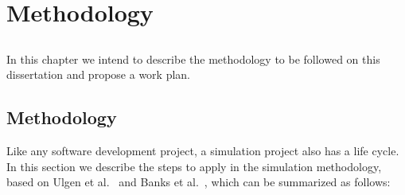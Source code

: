 \chapter{Methodology}\label{chap:method}

\section*{}

In this chapter we intend to describe the methodology to be followed on this 
dissertation and propose a work plan.

 

\section{Methodology} \label{sec:meth}

Like any software development project, a simulation project also has a life 
cycle. In this section we describe the steps to apply in the simulation 
methodology, based on Ulgen et al.~\cite{Ulgen1994} and Banks et 
al.~\cite[section 1.11]{Banks2004}, which can be summarized as follows:

